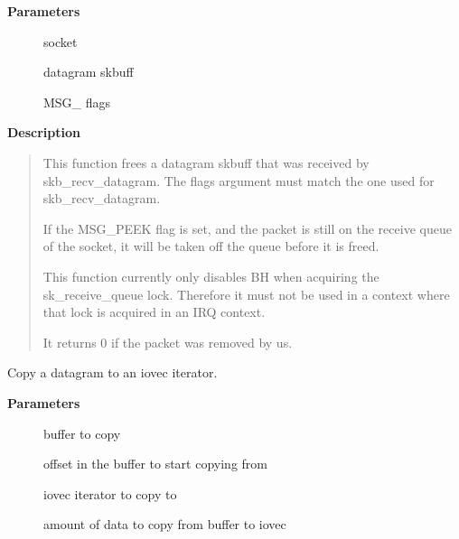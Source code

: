 \documentclass[a4paper,8pt,english]{sphinxmanual}
\begin{document}
\textbf{Parameters}
\begin{description}
\item[{}] \leavevmode
socket

\item[{}] \leavevmode
datagram skbuff

\item[{}] \leavevmode
MSG\_ flags

\end{description}

\textbf{Description}
\begin{quote}

This function frees a datagram skbuff that was received by
skb\_recv\_datagram.  The flags argument must match the one
used for skb\_recv\_datagram.

If the MSG\_PEEK flag is set, and the packet is still on the
receive queue of the socket, it will be taken off the queue
before it is freed.

This function currently only disables BH when acquiring the
sk\_receive\_queue lock.  Therefore it must not be used in a
context where that lock is acquired in an IRQ context.

It returns 0 if the packet was removed by us.
\end{quote}

\begin{fulllineitems}
\label{networking/kapi:c.skb_copy_datagram_iter}
Copy a datagram to an iovec iterator.

\end{fulllineitems}


\textbf{Parameters}
\begin{description}
\item[{}] \leavevmode
buffer to copy

\item[{}] \leavevmode
offset in the buffer to start copying from

\item[{}] \leavevmode
iovec iterator to copy to

\item[{}] \leavevmode
amount of data to copy from buffer to iovec

\end{description}
\end{document}
